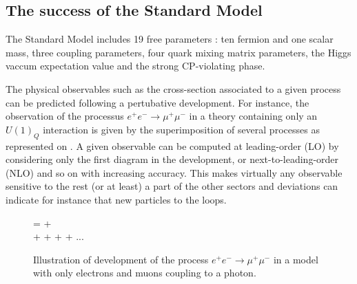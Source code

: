     \subsection{The success of the Standard Model \label{sec:standardModelSuccess}}

    The Standard Model includes 19 free parameters : ten fermion and one scalar mass, three
    coupling parameters, four quark mixing matrix parameters, the Higgs vaccum expectation
    value and the strong CP-violating phase.

    The physical observables such as the cross-section associated to a given process
    can be predicted following a pertubative development. For instance, the observation
    of the processus $e^+ e^- \rightarrow \mu^+ \mu^-$ in a theory containing only an $U(1)_Q$
    interaction is given by the superimposition of several processes as represented on
    . A given observable can be computed at leading-order
    (LO) by considering only the first diagram in the development, or next-to-leading-order (NLO)
    and so on with increasing accuracy. This makes virtually any observable sensitive
    to the rest (or at least) a part of the other sectors and deviations can indicate
    for instance that new particles to the loops.

    \begin{figure}
        \centering
        {
            =
            +
            \nonumber
            \\
            +
            +
            +
            +
            ...
            \nonumber
        }
        \caption{Illustration of development of the process $e^+ e^- \rightarrow \mu^+ \mu^-$
        in a model with only electrons and muons coupling to a photon. \label{fig:perturbativeDevelopment}}
    \end{figure}

